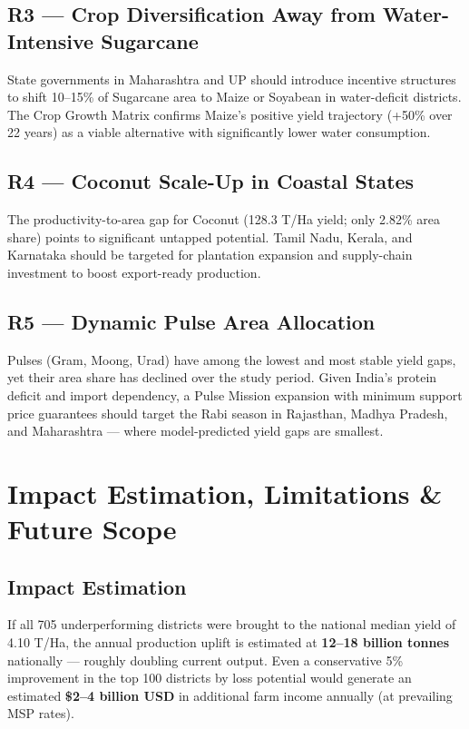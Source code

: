 \documentclass[10pt]{article}
\begin{document}
\subsection{R3 — Crop Diversification Away from Water-Intensive Sugarcane}
State governments in Maharashtra and UP should introduce incentive structures
to shift 10–15\% of Sugarcane area to Maize or Soyabean in water-deficit
districts. The Crop Growth Matrix confirms Maize's positive yield trajectory
(+50\% over 22 years) as a viable alternative with significantly lower
water consumption.

\subsection{R4 — Coconut Scale-Up in Coastal States}
The productivity-to-area gap for Coconut (128.3 T/Ha yield; only 2.82\%
area share) points to significant untapped potential. Tamil Nadu, Kerala,
and Karnataka should be targeted for plantation expansion and supply-chain
investment to boost export-ready production.

\subsection{R5 — Dynamic Pulse Area Allocation}
Pulses (Gram, Moong, Urad) have among the lowest and most stable yield
gaps, yet their area share has declined over the study period. Given India's
protein deficit and import dependency, a Pulse Mission expansion with
minimum support price guarantees should target the Rabi season in
Rajasthan, Madhya Pradesh, and Maharashtra — where model-predicted yield
gaps are smallest.

\section{Impact Estimation, Limitations \& Future Scope}

\subsection{Impact Estimation}
If all 705 underperforming districts were brought to the national median yield
of 4.10 T/Ha, the annual production uplift is estimated at
\textbf{12–18 billion tonnes} nationally — roughly doubling current output.
Even a conservative 5\% improvement in the top 100 districts by loss potential
would generate an estimated \textbf{\$2–4 billion USD} in additional farm income
annually (at prevailing MSP rates).
\end{document}
